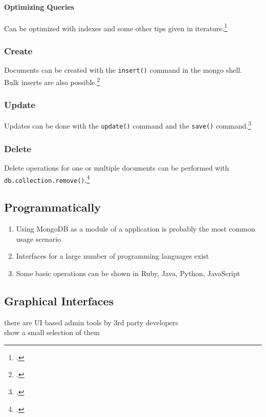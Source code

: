 \paragraph{Optimizing Queries}
Can be optimized with indexes and some other tips given in
iterature.\footcite[Cf.][TODO]{Chodorow_2011_tips}


\subsubsection{Create}
Documents can be created with the \texttt{insert()} command in the mongo
shell.\\
Bulk inserts are also possible.\footcite[Cf.][p. 53 et sqq.]{mongo_crud_manual}

\subsubsection{Update}
Updates can be done with the \texttt{update()} command and the \texttt{save()}
command.\footcite[Cf.][p. 75 et. sqq.]{mongo_crud_manual}

\subsubsection{Delete}
Delete operations for one or multiple documents can be performed with
\texttt{db.collection.remove()}.\footcite[Cf.][p. 83 et.
sqq.]{mongo_crud_manual}


\subsection{Programmatically}
\label{sec:usage-programmatically}
\begin{enumerate}
  \item Using MongoDB as a module of a application is probably the most common usage scenario
  \item Interfaces for a large number of programming languages exist
  \item Some basic operations can be shown in Ruby, Java, Python, JavaScript
\end{enumerate}


\subsection{Graphical Interfaces}
\label{sec:usage-gui}
there are UI based admin tools by 3rd party developers\\
show a small selection of them

